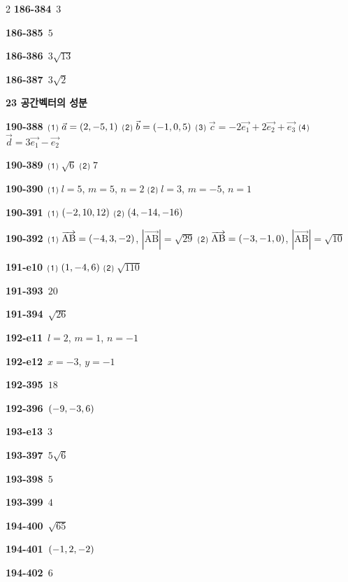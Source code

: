 \documentclass[10pt,a4paper]{article}
\newcommand{\vecAB}[1]{\overrightarrow{\mathrm{#1}}}
\begin{document}
\begin{multicols}{2}
\noindent\textbf{186-384}\ $3$\par
\noindent\textbf{186-385}\ $5$\par
\noindent\textbf{186-386}\ $3\sqrt{13}$\par
\noindent\textbf{186-387}\ $3\sqrt{2}$\par
\noindent\textbf{23 공간벡터의 성분}\par\smallskip
\noindent\textbf{190-388}\ ⑴ $\vec{a}=(2{,}\mkern3mu\mathopen{}-5{,}\mkern3mu\mathopen{}1)$ ⑵ $\vec{b}=(-1{,}\mkern3mu\mathopen{}0{,}\mkern3mu\mathopen{}5)$ ⑶ $\vec{c}=-2\vec{e_1}+2\vec{e_2}+\vec{e_3}$ ⑷ $\vec{d}=3\vec{e_1}-\vec{e_2}$\par
\noindent\textbf{190-389}\ ⑴ $\sqrt{6}$ ⑵ $7$\par
\noindent\textbf{190-390}\ ⑴ $l=5$, $m=5$, $n=2$ ⑵ $l=3$, $m=-5$, $n=1$\par
\noindent\textbf{190-391}\ ⑴ $(-2{,}\mkern3mu\mathopen{}10{,}\mkern3mu\mathopen{}12)$ ⑵ $(4{,}\mkern3mu\mathopen{}-14{,}\mkern3mu\mathopen{}-16)$\par
\noindent\textbf{190-392}\ ⑴ $\vecAB{AB}=(-4{,}\mkern3mu\mathopen{}3{,}\mkern3mu\mathopen{}-2)$, $|\vecAB{AB}|=\sqrt{29}$ ⑵ $\vecAB{AB}=(-3{,}\mkern3mu\mathopen{}-1{,}\mkern3mu\mathopen{}0)$, $|\vecAB{AB}|=\sqrt{10}$\par
\noindent\textbf{191-e10}\ ⑴ $(1{,}\mkern3mu\mathopen{}-4{,}\mkern3mu\mathopen{}6)$ ⑵ $\sqrt{110}$\par
\noindent\textbf{191-393}\ $20$\par
\noindent\textbf{191-394}\ $\sqrt{26}$\par
\noindent\textbf{192-e11}\ $l=2$, $m=1$, $n=-1$\par
\noindent\textbf{192-e12}\ $x=-3$, $y=-1$\par
\noindent\textbf{192-395}\ $18$\par
\noindent\textbf{192-396}\ $(-9{,}\mkern3mu\mathopen{}-3{,}\mkern3mu\mathopen{}6)$\par
\noindent\textbf{193-e13}\ $3$\par
\noindent\textbf{193-397}\ $5\sqrt{6}$\par
\noindent\textbf{193-398}\ $5$\par
\noindent\textbf{193-399}\ $4$\par
\noindent\textbf{194-400}\ $\sqrt{65}$\par
\noindent\textbf{194-401}\ $(-1{,}\mkern3mu\mathopen{}2{,}\mkern3mu\mathopen{}-2)$\par
\noindent\textbf{194-402}\ $6$\par

\end{multicols}
\end{document}
